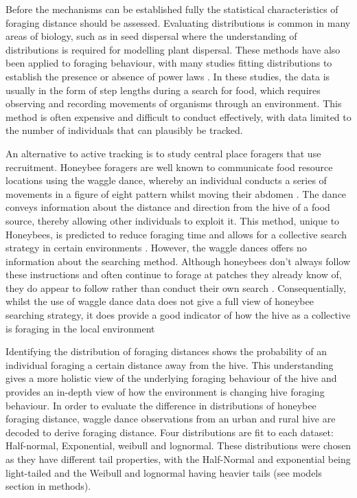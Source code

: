 \documentclass[11pt]{article}
\begin{document}
\begin{linenumbers}
Before the mechanisms can be established fully the statistical characteristics of foraging distance should be assessed. Evaluating distributions is common in many areas of biology, such as in seed dispersal \citep{Bullock2017} where the understanding of distributions is required for modelling plant dispersal. These methods have also been applied to foraging behaviour, with many studies fitting distributions to establish the presence or absence of power laws \citep{Murphy2007, Humphries2010, Breed2015}. In these studies, the data is usually in the form of step lengths during a search for food, which requires observing and recording movements of organisms through an environment. This method is often expensive and difficult to conduct effectively, with data limited to the number of individuals that can plausibly be tracked.\par

An alternative to active tracking is to study central place foragers that use recruitment. Honeybee foragers are well known to communicate food resource locations using the waggle dance, whereby an individual conducts a series of movements in a figure of eight pattern whilst moving their abdomen \citep{Dyer2002, Gruter2009}. The dance conveys information about the distance and direction from the hive of a food source, thereby allowing other individuals to exploit it. This method, unique to Honeybees, is predicted to reduce foraging time and allows for a collective search strategy in certain environments \citep{Dornhaus2006, Couvillon2014, Schurch2014}. However, the waggle dances offers no information about the searching method. Although honeybees don't always follow these instructions and often continue to forage at patches they already know of, they do appear to follow rather than conduct their own search \citep{Gruter2011, Wray2012}. Consequentially, whilst the use of waggle dance data does not give a full view of honeybee searching strategy, it does provide a good indicator of how the hive as a collective is foraging in the local environment \citep{Seeley1986}\par

Identifying the distribution of foraging distances shows the probability of an individual foraging a certain distance away from the hive. This understanding gives a more holistic view of the underlying foraging behaviour of the hive and provides an in-depth view of how the environment is changing hive foraging behaviour. In order to evaluate the difference in distributions of honeybee foraging distance, waggle dance observations from an urban and rural hive are decoded to derive foraging distance. Four distributions are fit to each dataset: Half-normal, Exponential, weibull and lognormal. These distributions were chosen as they have different tail properties, with the Half-Normal and exponential being light-tailed and the Weibull and lognormal having heavier tails (see models section in methods).\par


\end{linenumbers}
\end{document}
